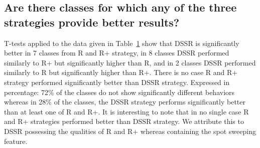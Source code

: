 \documentclass[conference]{IEEEtran}
\begin{document}
\begin{table}[htp]
\begin{tabular}{|r|l|r|r|r|l|}
\hline
\end{tabular}
\bigskip
\label{table:ttest}
\end{table}





\subsection{Are there classes for which any of the three strategies provide better results?}


T-tests applied to the data given in Table~\ref{table:ttest} show that DSSR is significantly better in 7 classes from R and R+ strategy, in 8 classes DSSR performed similarly to R+  but significantly higher than R, and in 2 classes DSSR performed similarly to R but significantly higher than R+. There is no case R and R+ strategy performed significantly better than DSSR strategy. Expressed in percentage: 72\%  of the classes do not show significantly different behaviors whereas in 28\% of the classes, the DSSR strategy performs significantly better than at least one of R and R+. It is interesting to note that in no single case R and R+ strategies performed better than DSSR strategy. We attribute this to DSSR possessing the qualities of R and R+ whereas containing the spot sweeping feature.
\end{document}
